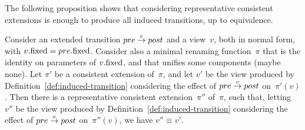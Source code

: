 The following proposition shows that considering representative consistent
extensions is enough to produce all induced transitions, up to equivalence. 
%
\begin{prop}
\label{prop:unfiying-renaming}
Consider an extended transition $pre \stackrel{e}\rightarrow post$ and a view~$v$, both in
normal form, with $v.\mathrm{fixed} = pre.\mathrm{fixed}$.  Consider also a minimal renaming
function~$\pi$ that is the identity on parameters of $v.\mathrm{fixed}$, and that
unifies some components (maybe none).
%
Let $\pi'$ be a consistent extension of~$\pi$, and
let $v'$ be the view produced by Definition~\ref{def:induced-transition}
considering the effect of $pre \stackrel{e}\rightarrow post$ on~$\pi'(v)$.  
%
Then there is a representative consistent extension~$\pi''$ of~$\pi$, such
that, letting $v''$ be the view produced by
Definition~\ref{def:induced-transition} considering the effect of $pre
\stackrel{e}\rightarrow post$ on~$\pi''(v)$, we have $v'' \equiv v'$.
\end{prop}
